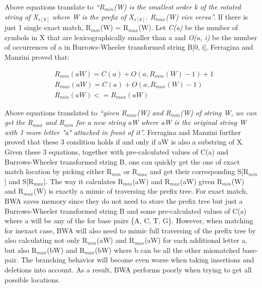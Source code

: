 Above equations translate to \textit{``R$_{min}$(W) is the smallest
order k of the rotated string of X$_{s[k]}$ where W is the prefix of
X$_{s[k]}$.  R$_{max}$(W) vice versa''.} If there is just 1 single
exact match, R$_{min}$(W) = R$_{max}$(W). Let \textit{C(a)} be the number of
symbols in X that are lexicographically smaller than a and \textit{O(a, i)} be
the number of occurrences of a in Burrows-Wheeler transformed string B[0, i],
Ferragina and Manzini proved that:

\begin{small}
\begin{align*} 
&\mathit{R}_{min}(aW) = C(a) + O(a,R_{min}(W) -1 ) + 1 \\
&\mathit{R}_{max}(aW) = C(a) + O(a,R_{max}(W) -1 ) \\
&\mathit{R}_{min}(aW) <= \mathit{R}_{max}(aW) 
\end{align*}
\end{small}

Above equations translated to \textit{``given R$_{max}$(W) and R$_{min}$(W) of
string W, we can get the R$_{max}$ and R$_{min}$ for a new string aW where aW
is the original string W with 1 more letter "a" attached in front of it''.}
Ferragina and Manzini further proved that these 3 condition holds if and only
if aW is also a substring of X. Given these 3 equations, together with
pre-calculated values of C(a) and Burrows-Wheeler transformed string B, one can
quickly get the one of exact match location by picking either R$_{min}$ or
R$_{max}$ and get their corresponding S[R$_{min}$] and S[R$_{max}$]. The way it
calculates R$_{min}$(aW) and R$_{max}$(aW) given R$_{min}$(W) and R$_{max}$(W)
is exactly a mimic of traversing the prefix tree. For exact match, BWA saves
memory since they do not need to store the prefix tree but just a
Burrows-Wheeler transformed string B and some pre-calculated values of C(a)
where a will be any of the for base pairs \{A, C, T, G\}. However, when
matching for inexact case, BWA will also need to mimic full traversing of the
prefix tree by also calculating not only R$_{min}$(aW) and R$_{max}$(aW) for
each additional letter a, but also R$_{max}$(bW) and R$_{max}$(bW) where b can
be all the other mismatched base-pair. The branching behavior will become even
worse when taking insertions and deletions into account. As a result, BWA
performs poorly when trying to get all possible locations.\\


